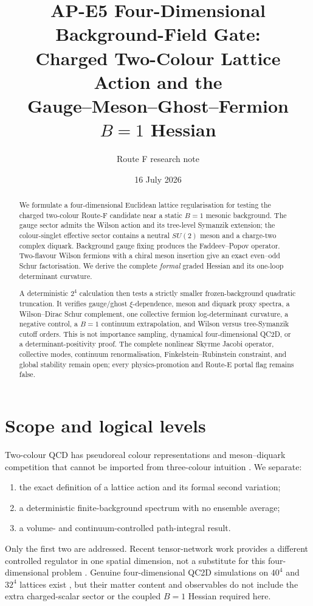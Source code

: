 \documentclass[11pt]{article}
\title{AP-E5 Four-Dimensional Background-Field Gate:\\
Charged Two-Colour Lattice Action and the\\
Gauge--Meson--Ghost--Fermion \(B=1\) Hessian}
\author{Route F research note}
\date{16 July 2026}
\theoremstyle{definition}
\theoremstyle{remark}
\begin{document}
\maketitle

\begin{abstract}
We formulate a four-dimensional Euclidean lattice regularisation for testing
the charged two-colour Route-F candidate near a static \(B=1\) mesonic
background.  The gauge sector admits the Wilson action and its tree-level
Symanzik extension; the colour-singlet effective sector contains a neutral
\(SU(2)\) meson and a charge-two complex diquark.  Background gauge fixing
produces the Faddeev--Popov operator.  Two-flavour Wilson fermions with a
chiral meson insertion give an exact even--odd Schur factorisation.  We derive
the complete \emph{formal} graded Hessian and its one-loop determinant
curvature.

A deterministic \(2^4\) calculation then tests a strictly smaller
frozen-background quadratic truncation.  It verifies gauge/ghost
\(\xi\)-dependence, meson and diquark proxy spectra, a Wilson--Dirac Schur
complement, one collective fermion log-determinant curvature, a negative
control, a \(B=1\) continuum extrapolation, and Wilson versus
tree-Symanzik cutoff orders.  This is not importance sampling, dynamical
four-dimensional QC2D, or a determinant-positivity proof.  The complete
nonlinear Skyrme Jacobi operator, collective modes, continuum
renormalisation, Finkelstein--Rubinstein constraint, and global stability
remain open; every physics-promotion and Route-E portal flag remains false.
\end{abstract}

\tableofcontents

\section{Scope and logical levels}

Two-colour QCD has pseudoreal colour representations and meson--diquark
competition that cannot be imported from three-colour intuition
\cite{KogutEtAl2000,HandsEtAl2006}.  We separate:
\begin{enumerate}[label=(L\arabic*)]
\item the exact definition of a lattice action and its formal second
variation;
\item a deterministic finite-background spectrum with no ensemble average;
\item a volume- and continuum-controlled path-integral result.
\end{enumerate}
Only the first two are addressed.  Recent tensor-network work provides a
different controlled regulator in one spatial dimension, not a substitute
for this four-dimensional problem \cite{PaiAkiyamaTodo2025}.  Genuine
four-dimensional QC2D simulations on \(40^4\) and \(32^4\) lattices exist
\cite{BegunEtAl2022}, but their matter content and observables do not include
the extra charged-scalar sector or the coupled \(B=1\) Hessian required here.
\end{document}
